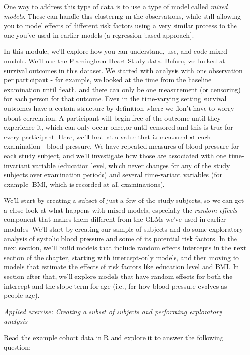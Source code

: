 \documentclass[
]{book}
\begin{document}
One way to address this type of data is to use a type of model called \emph{mixed
models}. These can handle this clustering in the observations, while still
allowing you to model effects of different risk factors using a very similar
process to the one you've used in earlier models (a regression-based approach).

In this module, we'll explore how you can understand, use, and code mixed
models. We'll use the Framingham Heart Study data. Before, we looked at survival
outcomes in this dataset. We started with analysis with one observation per participant -
for example, we looked at the time from the baseline examination until
death, and there can only be one measurement (or censoring) for each person
for that outcome. Even in the time-varying setting survival outcomes have a certain
structure by definition where we don't have to worry about correlation. A participant
will begin free of the outcome until they experience it, which can only occur once,or until
censored and this is true for every participant. Here, we'll look at a value that
is measured at each examination---blood pressure. We have repeated measures of blood
pressure for each study subject, and we'll investigate how those are associated with
one time-invariant variable (education level, which never changes for any
of the study subjects over examination periods) and several time-variant
variables (for example, BMI, which is recorded at all examinations).

We'll start by creating a subset of just a few of the study subjects, so we can
get a close look at what happens with mixed models, especially the \emph{random
effects} component that makes them different from the GLMs we've used in earlier
modules. We'll start by creating our sample of subjects and do some exploratory
analysis of systolic blood pressure and some of its potential risk factors. In
the next section, we'll build models that include random effects intercepts in
the next section of the chapter, starting with intercept-only models, and then
moving to models that estimate the effects of risk factors like education level
and BMI. In section after that, we'll explore models that have random effects
for both the intercept and the slope term for age (i.e., for how blood pressure
evolves as people age).

\emph{Applied exercise: Creating a subset of subjects and performing exploratory analysis}

Read the example cohort data in R and explore it to answer the following
question:
\end{document}
